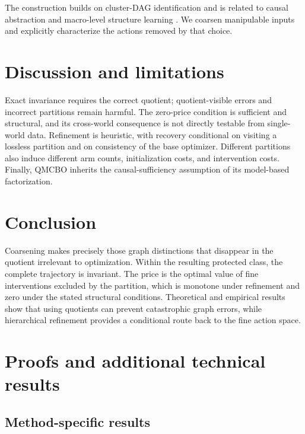 \documentclass[twoside]{article}
\begin{document}
The construction builds on cluster-DAG identification \citep{CausalEffectIdentification} and is related to causal abstraction and macro-level structure learning \citep{beckersAbstractingCausalModels2019,madaleno2026a}. We coarsen manipulable inputs and explicitly characterize the actions removed by that choice.

\section{Discussion and limitations}
\label{sec:limitations}

Exact invariance requires the correct quotient; quotient-visible errors and incorrect partitions remain harmful. The zero-price condition is sufficient and structural, and its cross-world consequence is not directly testable from single-world data. Refinement is heuristic, with recovery conditional on visiting a lossless partition and on consistency of the base optimizer. Different partitions also induce different arm counts, initialization costs, and intervention costs. Finally, QMCBO inherits the causal-sufficiency assumption of its model-based factorization.

\section{Conclusion}
\label{sec:conclusion}

Coarsening makes precisely those graph distinctions that disappear in the quotient irrelevant to optimization. Within the resulting protected class, the complete trajectory is invariant. The price is the optimal value of fine interventions excluded by the partition, which is monotone under refinement and zero under the stated structural conditions. Theoretical and empirical results show that using quotients can prevent catastrophic graph errors, while hierarchical refinement provides a conditional route back to the fine action space.




\appendix \onecolumn \raggedbottom

\section{Proofs and additional technical results}
\label{app:proofs}

\subsection{Method-specific results}
\end{document}
